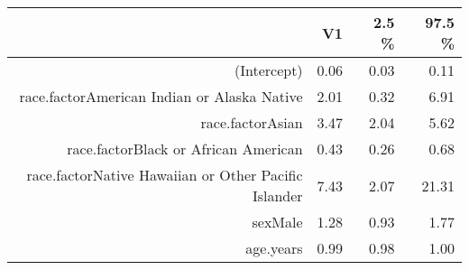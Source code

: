 \begin{table}[ht]
\centering
\begin{tabular}{rrrr}
  \hline
 & V1 & 2.5 \% & 97.5 \% \\ 
  \hline
(Intercept) & 0.06 & 0.03 & 0.11 \\ 
  race.factorAmerican Indian or Alaska Native & 2.01 & 0.32 & 6.91 \\ 
  race.factorAsian & 3.47 & 2.04 & 5.62 \\ 
  race.factorBlack or African American & 0.43 & 0.26 & 0.68 \\ 
  race.factorNative Hawaiian or Other Pacific Islander & 7.43 & 2.07 & 21.31 \\ 
  sexMale & 1.28 & 0.93 & 1.77 \\ 
  age.years & 0.99 & 0.98 & 1.00 \\ 
   \hline
\end{tabular}
\end{table}
